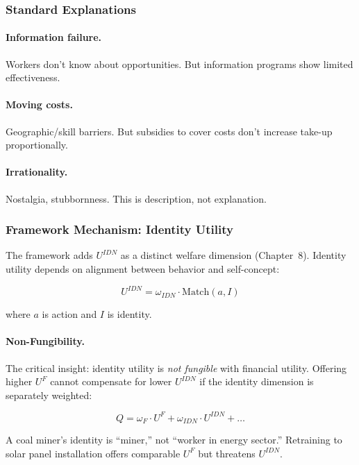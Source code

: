 \subsubsection{Standard Explanations}

\paragraph{Information failure.} Workers don't know about opportunities.
But information programs show limited effectiveness.

\paragraph{Moving costs.} Geographic/skill barriers.
But subsidies to cover costs don't increase take-up proportionally.

\paragraph{Irrationality.} Nostalgia, stubbornness.
This is description, not explanation.

\subsubsection{Framework Mechanism: Identity Utility}

The framework adds $U^{IDN}$ as a distinct welfare dimension (Chapter~8).
Identity utility depends on alignment between behavior and self-concept:

\begin{equation}
U^{IDN} = \omega_{IDN} \cdot \text{Match}(a, I)
\end{equation}

where $a$ is action and $I$ is identity.

\paragraph{Non-Fungibility.}
The critical insight: identity utility is \emph{not fungible} with financial utility.
Offering higher $U^F$ cannot compensate for lower $U^{IDN}$ if the identity 
dimension is separately weighted:

\begin{equation}
Q = \omega_F \cdot U^F + \omega_{IDN} \cdot U^{IDN} + \ldots
\end{equation}

A coal miner's identity is ``miner,'' not ``worker in energy sector.'' 
Retraining to solar panel installation offers comparable $U^F$ but 
threatens $U^{IDN}$.

